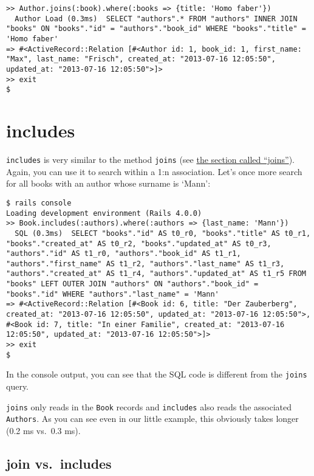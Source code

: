\documentclass[a4paper]{book}
\newcommand{\chap}[1]{\newpage\thispagestyle{empty}\chapter{#1}\label{chap:\thechapter}}
\begin{document}
\begin{shaded}\begin{verbatim}
>> Author.joins(:book).where(:books => {title: 'Homo faber'})
  Author Load (0.3ms)  SELECT "authors".* FROM "authors" INNER JOIN "books" ON "books"."id" = "authors"."book_id" WHERE "books"."title" = 'Homo faber'
=> #<ActiveRecord::Relation [#<Author id: 1, book_id: 1, first_name: "Max", last_name: "Frisch", created_at: "2013-07-16 12:05:50", updated_at: "2013-07-16 12:05:50">]>
>> exit
$
\end{verbatim}\end{shaded}

\chap{includes}\label{includes}

\texttt{includes} is very similar to the method \texttt{joins} (see \hyperref[activerecordux5f1nux5fjoins]{the section called “joins”}). Again, you can use it to search within a 1:n association. Let's once more search for all books with an author whose surname is `Mann':

\begin{shaded}\begin{verbatim}
$ rails console
Loading development environment (Rails 4.0.0)
>> Book.includes(:authors).where(:authors => {last_name: 'Mann'})
  SQL (0.3ms)  SELECT "books"."id" AS t0_r0, "books"."title" AS t0_r1, "books"."created_at" AS t0_r2, "books"."updated_at" AS t0_r3, "authors"."id" AS t1_r0, "authors"."book_id" AS t1_r1, "authors"."first_name" AS t1_r2, "authors"."last_name" AS t1_r3, "authors"."created_at" AS t1_r4, "authors"."updated_at" AS t1_r5 FROM "books" LEFT OUTER JOIN "authors" ON "authors"."book_id" = "books"."id" WHERE "authors"."last_name" = 'Mann'
=> #<ActiveRecord::Relation [#<Book id: 6, title: "Der Zauberberg", created_at: "2013-07-16 12:05:50", updated_at: "2013-07-16 12:05:50">, #<Book id: 7, title: "In einer Familie", created_at: "2013-07-16 12:05:50", updated_at: "2013-07-16 12:05:50">]>
>> exit
$
\end{verbatim}\end{shaded}

In the console output, you can see that the SQL code is different from the \texttt{joins} query.

\texttt{joins} only reads in the \texttt{Book} records and \texttt{includes} also reads the associated \texttt{Authors}. As you can see even in our little example, this obviously takes longer (0.2 ms vs.~0.3 ms).

\section{join vs.~includes}\label{join-vs.includes}
\end{document}
